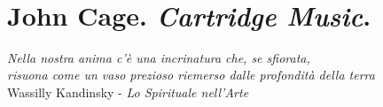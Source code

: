 \documentclass[%
			   a4paper,
			   twoside
			   ]{book}
\newcommand\frameattext[3]{%
  \linethickness{#3}%
  \AddToShipoutPicture*{%
    \AtTextLowerLeft{%
       \put(\LenToUnit{-,5\extraxsep},\LenToUnit{-0.5\extraysep}){\color{#1}%
             \rule{\dimexpr\textwidth+\extraxsep\relax}{\dimexpr\textheight+\extraysep\relax}}%
       \put(\LenToUnit{-,5\extraxsep},\LenToUnit{-0.5\extraysep}){\color{#2}%
       \framebox(\LenToUnit{\dimexpr\textwidth+\extraxsep\relax},%
                 \LenToUnit{\dimexpr\textheight+\extraysep\relax}){}
       }
    }%
  }%
}
\begin{document}
\setlength{\columnsep}{.4in}

\frameattext{white}{black}{2pt}

\begin{center}
	~\\
	\vfill
    \fontsize{19}{19}\selectfont{Giuseppe SILVI} \\
		\vspace{1cm}
    \fontsize{81}{54}\selectfont{EIME \#01} \\
	\vfill
	\fontsize{19}{10} \\
		\vspace{1cm}
	\fontsize{19}{19}\selectfont{draft 001\\
								 \today}
	\vfill

\end{center}

\thispagestyle{empty}

%
%
%
%
%
%
%
%
\clearpage



\chapter*{John Cage. \emph{Cartridge Music}.}

	\begin{flushright}
		\textit{Nella nostra anima c'è una incrinatura che, se sfiorata, \\
		risuona come un vaso prezioso riemerso dalle profondità della terra} \\
		Wassilly Kandinsky - \emph{Lo Spirituale nell'Arte}
	\end{flushright}
\end{document}
